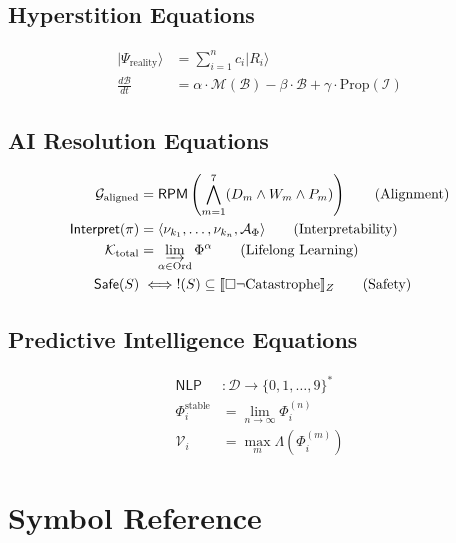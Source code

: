 \documentclass[11pt,twoside]{book}
\newcommand{\noe}[1]{\nu_{#1}}
\newcommand{\TransFrac}[1]{\Phi^{#1}}
\newcommand{\FractalAttractor}{\mathcal{A}_\Phi}
\newcommand{\RPM}{\mathsf{RPM}}
\newcommand{\Lacunarity}{\Lambda}
\newcommand{\sem}[1]{\llbracket #1 \rrbracket}
\newcommand{\ProfileFrac}{\Phi}
\newcommand{\AIGoal}{\mathcal{G}}
\newcommand{\Interpret}{\mathsf{Interpret}}
\newcommand{\NLP}{\mathsf{NLP}}
\newcommand{\DigitalTrace}{\mathcal{D}}
\theoremstyle{definition}
\theoremstyle{plain}
\theoremstyle{remark}
\begin{document}
\section{Hyperstition Equations}
\begin{align}
|\Psi_{\text{reality}}\rangle &= \sum_{i=1}^{n} c_i |R_i\rangle \tag{Superposition} \\
\frac{d\mathcal{B}}{dt} &= \alpha \cdot \mathcal{M}(\mathcal{B}) - \beta \cdot \mathcal{B} + \gamma \cdot \mathrm{Prop}(\mathcal{I}) \tag{Dynamics}
\end{align}

\section{AI Resolution Equations}
\begin{align}
\AIGoal_{\mathrm{aligned}} &= \RPM\left(\bigwedge_{m=1}^{7} (D_m \wedge W_m \wedge P_m)\right) \tag{Alignment} \\
\Interpret(\pi) &= \langle \noe{k_1}, \ldots, \noe{k_n}, \FractalAttractor \rangle \tag{Interpretability} \\
\mathcal{K}_{\mathrm{total}} &= \varinjlim_{\alpha \in \mathrm{Ord}} \TransFrac{\alpha} \tag{Lifelong Learning} \\
\mathsf{Safe}(S) &\iff !(S) \subseteq \sem{\Box \neg \mathrm{Catastrophe}}_Z \tag{Safety}
\end{align}

\section{Predictive Intelligence Equations}
\begin{align}
\NLP &: \DigitalTrace \to \{0, 1, \ldots, 9\}^* \tag{Stage 1} \\
\ProfileFrac_i^{\text{stable}} &= \lim_{n \to \infty} \ProfileFrac_i^{(n)} \tag{Stage 2-3} \\
\mathcal{V}_i &= \max_m \Lacunarity(\ProfileFrac_i^{(m)}) \tag{Stage 6}
\end{align}

\chapter{Symbol Reference}
\label{app:symbols}
\end{document}
